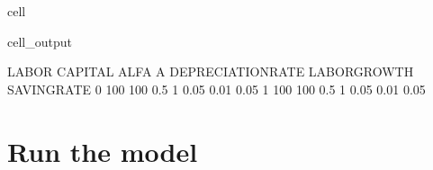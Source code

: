 \documentclass[letterpaper,10pt,english]{jupyterBook}
\begin{document}
\begin{sphinxuseclass}{cell}
\begin{sphinxVerbatimOutput}
\begin{sphinxuseclass}{cell_output}
\begin{sphinxVerbatim}[commandchars=\\\{\}]
   LABOR  CAPITAL  ALFA  A  DEPRECIATION\PYGZus{}RATE  LABOR\PYGZus{}GROWTH  SAVING\PYGZus{}RATE
0    100      100   0.5  1               0.05          0.01         0.05
1    100      100   0.5  1               0.05          0.01         0.05
\end{sphinxVerbatim}

\end{sphinxuseclass}\end{sphinxVerbatimOutput}

\end{sphinxuseclass}

\section{Run the model}
\label{\detokenize{content/notebooks/intro/Example Solow:run-the-model}}
\end{document}
